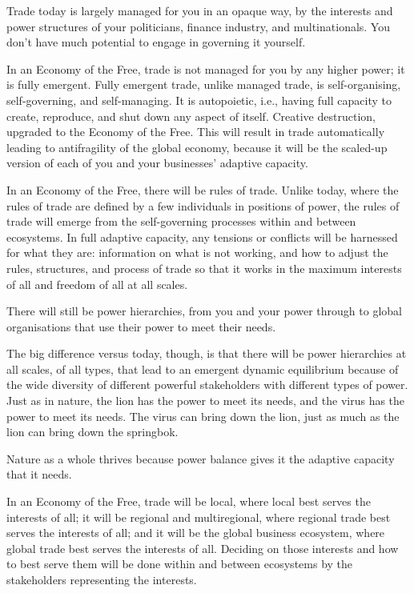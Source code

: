 Trade today is largely managed for you in an opaque way, by the interests and power structures of your politicians, finance industry, and multinationals. You don’t have much potential to engage in governing it yourself.


In an Economy of the Free, trade is not managed for you by any higher power; it is fully emergent. Fully emergent trade, unlike managed trade, is self-organising, self-governing, and self-managing. It is autopoietic, i.e., having full capacity to create, reproduce, and shut down any aspect of itself. Creative destruction\cite{schumpeter-capitalism}, upgraded to the Economy of the Free. This will result in trade automatically leading to antifragility of the global economy, because it will be the scaled-up version of each of you and your businesses’ adaptive capacity.


In an Economy of the Free,  there will be rules of trade. Unlike today, where the rules of trade are defined by a few individuals in positions of power, the rules of trade will emerge from the self-governing processes within and between ecosystems. In full adaptive capacity, any tensions or conflicts will be harnessed for what they are: information on what is not working, and how to adjust the rules, structures, and process of trade so that it works in the maximum interests of all and freedom of all at all scales.


There will still be power hierarchies, from you and your power through to global organisations that use their power to meet their needs. 


The big difference versus today, though, is that there will be power hierarchies at all scales, of all types, that lead to an emergent dynamic equilibrium  because of the wide diversity of different powerful stakeholders with different types of power.  Just as in nature, the lion has the power to meet its needs, and the virus has the power to meet its needs. The virus  can bring down the lion, just as much as the lion can bring down the springbok. 


Nature as a whole thrives because power balance gives it the adaptive capacity that it needs.


In an Economy of the Free, trade will be local, where local best serves the interests of all; it will be regional and multiregional, where regional trade best serves the interests of all; and it will be the global business ecosystem, where global trade best serves the interests of all. Deciding on those interests and how to best serve them will be done within and between ecosystems by the stakeholders representing the interests.


